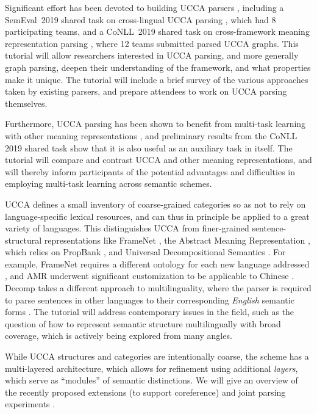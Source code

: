 \documentclass[11pt,a4paper,table]{article}
\begin{document}
Significant effort has been devoted to building UCCA parsers
\cite{hershcovich2017a,jiang-19,zhang2019broad},
including a SemEval~2019 shared task
on cross-lingual UCCA parsing \citep{hershcovich2019shared},
which had 8 participating teams,
and a CoNLL~2019 shared task on cross-framework meaning representation
parsing \cite{Oep:Abe:Haj:19},
where 12 teams submitted parsed UCCA graphs.
This tutorial will allow researchers interested in UCCA parsing, and more generally graph parsing, deepen their understanding of the framework, 
and what properties make it unique.
The tutorial will include a brief survey of the various approaches taken by existing parsers, and prepare attendees to work on UCCA parsing themselves.

Furthermore, UCCA parsing has been shown to benefit from multi-task learning
\cite{caruana1998multitask}
with other meaning representations \cite{hershcovich2018multitask}, and
preliminary results from the CoNLL 2019 shared task \cite{Oep:Abe:Haj:19}
show that it is also useful as an auxiliary task in itself.
The tutorial will compare and contrast UCCA and other meaning representations,
and will thereby inform participants of the potential advantages and difficulties
in employing multi-task learning across semantic schemes.

UCCA defines a small inventory of coarse-grained categories so as not to rely on language-specific lexical resources, and  can thus in principle be applied to a great variety of languages. This distinguishes UCCA from finer-grained sentence-structural representations like FrameNet \citep{Baker:98}, the Abstract Meaning Representation \citep[AMR;][]{banarescu2013abstract}, which relies on PropBank \citep{Palmer:05},
and Universal Decompositional Semantics \citep[Decomp;][]{white2016universal}.
For example, FrameNet requires a different ontology for each new language addressed \cite{ohara2003japanese,You2005BuildingCF,borin20132,park2014frame,hayoun-elhadad-2016-hebrew,djemaa-etal-2016-corpus},
and AMR underwent significant customization to be applicable to Chinese
\cite{li-etal-2016-annotating}. Decomp takes a different approach to multilinguality, where the parser is required to parse sentences in other languages to their corresponding {\it English} semantic forms \citep{zhang2018cross}.
The tutorial will address contemporary issues in the field, such as
the question of how to represent semantic structure multilingually with
broad coverage, which is actively being explored from many angles.

While UCCA structures and categories are intentionally coarse, the scheme has a multi-layered architecture, which allows for refinement using additional {\it layers}, which serve as ``modules'' of semantic distinctions.
We will give an overview of the recently proposed extensions
(to support coreference) and joint parsing experiments \citep{prange2019made,prange2019semantically}.
\end{document}
